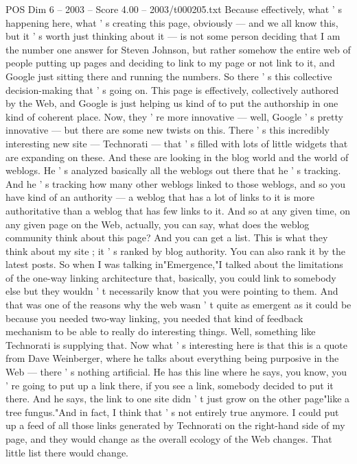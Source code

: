 \begin{textsample}{POS Dim 6 – 2003 – Score 4.00 – 2003/t000205.txt}
Because effectively, what ' s happening here, what ' s creating this page, obviously — and we all know this, but it ' s worth just thinking about it — is not some person deciding that I am the number one answer for Steven Johnson, but rather somehow the entire web of people putting up pages and deciding to link to my page or not link to it, and Google just sitting there and running the numbers.
So there ' s this collective decision-making that ' s going on.
This page is effectively, collectively authored by the Web, and Google is just helping us kind of to put the authorship in one kind of coherent place.
Now, they ' re more innovative — well, Google ' s pretty innovative — but there are some new twists on this.
There ' s this incredibly interesting new site — Technorati — that ' s filled with lots of little widgets that are expanding on these.
And these are looking in the blog world and the world of weblogs.
He ' s analyzed basically all the weblogs out there that he ' s tracking.
And he ' s tracking how many other weblogs linked to those weblogs, and so you have kind of an authority — a weblog that has a lot of links to it is more authoritative than a weblog that has few links to it.
And so at any given time, on any given page on the Web, actually, you can say, what does the weblog community think about this page?
And you can get a list.
This is what they think about my site ; it ' s ranked by blog authority.
You can also rank it by the latest posts.
So when I was talking in"Emergence,"I talked about the limitations of the one-way linking architecture that, basically, you could link to somebody else but they wouldn ' t necessarily know that you were pointing to them.
And that was one of the reasons why the web wasn ' t quite as emergent as it could be because you needed two-way linking, you needed that kind of feedback mechanism to be able to really do interesting things.
Well, something like Technorati is supplying that.
Now what ' s interesting here is that this is a quote from Dave Weinberger, where he talks about everything being purposive in the Web — there ' s nothing artificial.
He has this line where he says, you know, you ' re going to put up a link there, if you see a link, somebody decided to put it there.
And he says, the link to one site didn ' t just grow on the other page"like a tree fungus."And in fact, I think that ' s not entirely true anymore.
I could put up a feed of all those links generated by Technorati on the right-hand side of my page, and they would change as the overall ecology of the Web changes.
That little list there would change.

\end{textsample}
